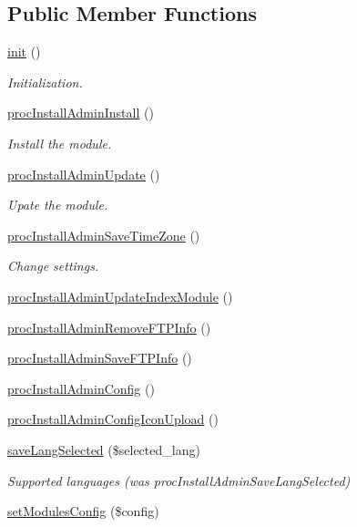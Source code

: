 \subsection*{Public Member Functions}
\begin{DoxyCompactItemize}
\item 
\hyperlink{classinstallAdminController_a3eda4638a74c9a92eba2803c1beff6a3}{init} ()
\begin{DoxyCompactList}\small\item\em Initialization. \end{DoxyCompactList}\item 
\hyperlink{classinstallAdminController_a9aa974c8cc406f536e712000ae7c431b}{proc\+Install\+Admin\+Install} ()
\begin{DoxyCompactList}\small\item\em Install the module. \end{DoxyCompactList}\item 
\hyperlink{classinstallAdminController_a90423de1ab7aee1f0eb7a48af5d05224}{proc\+Install\+Admin\+Update} ()
\begin{DoxyCompactList}\small\item\em Upate the module. \end{DoxyCompactList}\item 
\hyperlink{classinstallAdminController_a0b7b97dd361bda6202fb1c8895852960}{proc\+Install\+Admin\+Save\+Time\+Zone} ()
\begin{DoxyCompactList}\small\item\em Change settings. \end{DoxyCompactList}\item 
\hyperlink{classinstallAdminController_ae72e98f16d94d17f94d7cdce7060faed}{proc\+Install\+Admin\+Update\+Index\+Module} ()
\item 
\hyperlink{classinstallAdminController_a76919653ad07627e7f0aa4b01cc2b9fe}{proc\+Install\+Admin\+Remove\+F\+T\+P\+Info} ()
\item 
\hyperlink{classinstallAdminController_a3ea9e37eed169cfa5448359db173f263}{proc\+Install\+Admin\+Save\+F\+T\+P\+Info} ()
\item 
\hyperlink{classinstallAdminController_a57d9a607291587b656246beca9fd51fe}{proc\+Install\+Admin\+Config} ()
\item 
\hyperlink{classinstallAdminController_a43a0d4db547322f22884c7dffbda6b87}{proc\+Install\+Admin\+Config\+Icon\+Upload} ()
\item 
\hyperlink{classinstallAdminController_ae7c646732649d1b526f0740d988a4164}{save\+Lang\+Selected} (\$selected\+\_\+lang)
\begin{DoxyCompactList}\small\item\em Supported languages (was proc\+Install\+Admin\+Save\+Lang\+Selected) \end{DoxyCompactList}\item 
\hyperlink{classinstallAdminController_ab19d26e4473d9b40a494d5b1f1dbb996}{set\+Modules\+Config} (\$config)
\end{DoxyCompactItemize}
